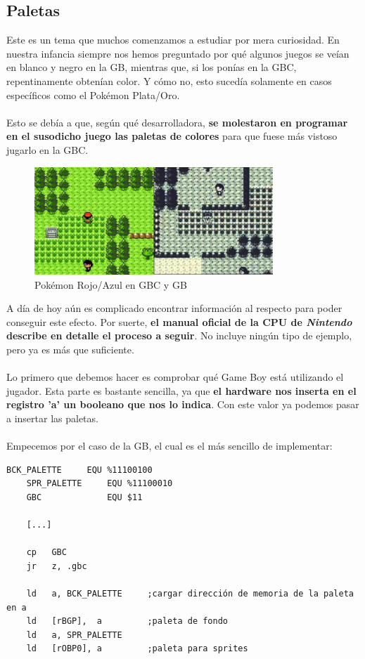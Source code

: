 \subsection{Paletas}

Este es un tema que muchos comenzamos a estudiar por mera curiosidad. En nuestra infancia siempre nos hemos preguntado por qué algunos juegos se veían en blanco y negro en la GB, mientras que, si los ponías en la GBC, repentinamente obtenían color. Y cómo no, esto sucedía solamente en casos específicos como el Pokémon Plata/Oro.
\\ \\
Esto se debía a que, según qué desarrolladora, \textbf{se molestaron en programar en el susodicho juego las paletas de colores} para que fuese más vistoso jugarlo en la GBC.

\clearpage

\begin{figure}[h]
\centering
\includegraphics[width=0.8\textwidth]{include/images/desarrollo/paletas_pokemon.png}
\caption{Pokémon Rojo/Azul en GBC y GB}
\label{figure:poke_palette}
\end{figure}

A día de hoy aún es complicado encontrar información al respecto para poder conseguir este efecto. Por suerte, \textbf{el manual oficial de la CPU de \textit{Nintendo} describe en detalle el proceso a seguir}. No incluye ningún tipo de ejemplo, pero ya es más que suficiente.
\\ \\
Lo primero que debemos hacer es comprobar qué Game Boy está utilizando el jugador. Esta parte es bastante sencilla, ya que \textbf{el hardware nos inserta en el registro 'a' un booleano que nos lo indica}. Con este valor ya podemos pasar a insertar las paletas.
\\ \\
Empecemos por el caso de la GB, el cual es el más sencillo de implementar:
	
\begin{lstlisting}[caption={Paleta para la GB}, label={code:palette_GB}]
	BCK_PALETTE 	EQU %11100100
	SPR_PALETTE 	EQU %11100010
	GBC 			EQU $11

	[...]
	
	cp   GBC
	jr   z, .gbc

	ld   a, BCK_PALETTE 	;cargar dirección de memoria de la paleta en a
	ld   [rBGP],  a  		;paleta de fondo
	ld   a, SPR_PALETTE
	ld   [rOBP0], a  		;paleta para sprites
\end{lstlisting}

